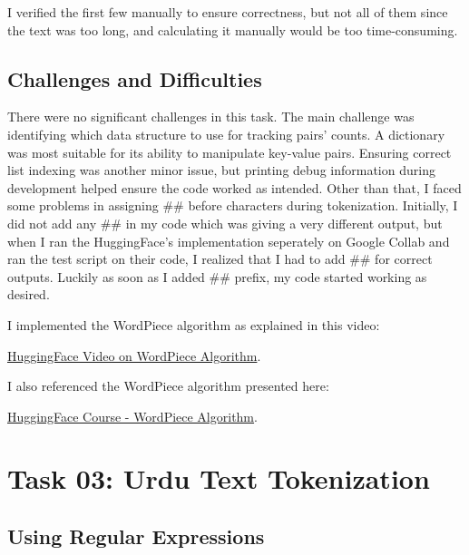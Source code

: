 \documentclass[a4paper,12pt]{article}
\begin{document}
I verified the first few manually to ensure correctness, but not all of them since the text was too long, and calculating it manually would be too time-consuming.

\subsection{Challenges and Difficulties}

There were no significant challenges in this task. The main challenge was identifying which data structure to use for tracking pairs' counts. A dictionary was most suitable for its ability to manipulate key-value pairs. Ensuring correct list indexing was another minor issue, but printing debug information during development helped ensure the code worked as intended. Other than that, I faced some problems in assigning \#\# before characters during tokenization.
Initially, I did not add any \#\# in my code which was giving a very different output, but when I ran the HuggingFace's implementation seperately on Google Collab and ran the test script on their code, I realized that I had to add \#\# for correct outputs. Luckily as soon as I added \#\# prefix, my code started working as desired.

I implemented the WordPiece algorithm as explained in this video:

\href{https://youtu.be/qpv6ms_t_1A?si=F-v5NCcJ6SvIVLvX}{HuggingFace Video on WordPiece Algorithm}.

I also referenced the WordPiece algorithm presented here:

\href{https://huggingface.co/learn/nlp-course/en/chapter6/6}{HuggingFace Course - WordPiece Algorithm}.

\section{Task 03: Urdu Text Tokenization}

\subsection{Using Regular Expressions}
\end{document}
